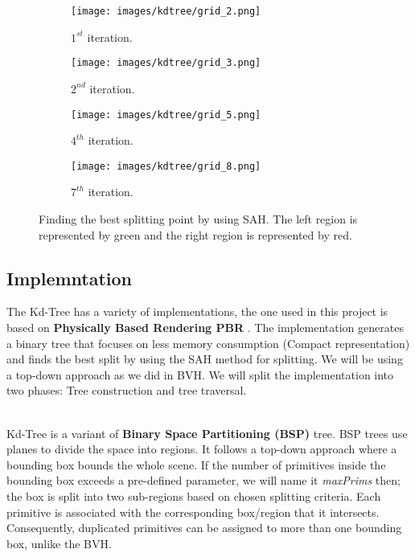 \documentclass[11pt,a4paper]{article}
\begin{document}
\begin{figure}[H]	
     \centering
     \begin{subfigure}[b]{0.475\textwidth}
         \centering
         \texttt{[image: images/kdtree/grid\_2.png]}
         \caption{$1^{st} $ iteration.}
         \label{fig:pi_4000}
     \end{subfigure}
     \hfill
     \begin{subfigure}[b]{0.475\textwidth}
         \centering
         \texttt{[image: images/kdtree/grid\_3.png]}
         \caption{$2^{nd} $ iteration.}
         \label{fig:pi_5000}
     \end{subfigure}
     \hfill
     \begin{subfigure}[b]{0.475\textwidth}
         \centering
         \texttt{[image: images/kdtree/grid\_5.png]}
         \caption{$4^{th} $ iteration.}
         \label{fig:pi_18000}
     \end{subfigure}
     \hfill
     \begin{subfigure}[b]{0.475\textwidth}
         \centering
         \texttt{[image: images/kdtree/grid\_8.png]}
         \caption{$7^{th} $ iteration.}
         \label{fig:pi_18000}
     \end{subfigure}
        \captionsetup{justification=centering,margin=2cm}
        \caption{Finding the best splitting point by using SAH. The left region is represented by green and the right region is represented by red.}
        \label{fig:sahdemo}
\end{figure}


\subsection{Implemntation}
The Kd-Tree has a variety of implementations, the one used in this project is based on \textbf{Physically Based Rendering PBR} \protect\cite{Pharr2016}. The implementation generates a binary tree that focuses on less memory consumption (Compact representation) and finds the best split by using the SAH method for splitting. We will be using a top-down approach as we did in BVH. We will split the implementation into two phases: Tree construction and tree traversal.

\noindent
\\
Kd-Tree is a variant of \textbf{Binary Space Partitioning (BSP)} tree. BSP trees use planes to divide the space into regions. It follows a top-down approach where a bounding box bounds the whole scene. If the number of primitives inside the bounding box exceeds a pre-defined parameter, we will name it \textit{maxPrims} then; the box is split into two sub-regions based on chosen splitting criteria. Each primitive is associated with the corresponding box/region that it intersects. Consequently, duplicated primitives can be assigned to more than one bounding box, unlike the BVH.
\end{document}
